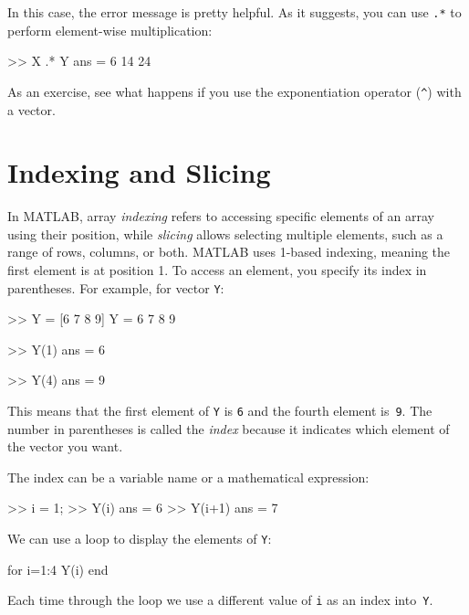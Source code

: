 In this case, the error message is pretty helpful.  As it suggests, you can use \lstinline{.*} to perform element-wise multiplication:


\begin{code}
>> X .* Y
ans = 6    14    24
\end{code}

As an exercise, see what happens if you use the exponentiation operator
(\lstinline{^}) with a vector.

\section{Indexing and Slicing}

In MATLAB, array \emph{indexing} refers to accessing specific elements of an array using their position, while \emph{slicing} allows selecting multiple elements, such as a range of rows, columns, or both.  MATLAB uses 1-based indexing, meaning the first element is at position 1. To access an element, you specify its index in parentheses. For example, for vector \lstinline{Y}:



\begin{code}
>> Y = [6 7 8 9]
Y = 6    7     8     9

>> Y(1)
ans = 6

>> Y(4)
ans = 9
\end{code}

This means that the first element of \lstinline{Y} is \lstinline{6} and the
fourth element is~\lstinline{9}.  
The number in parentheses is called the \emph{index} because it indicates which element of the vector you want.


The index can be a variable name or a mathematical expression:

\begin{code}
>> i = 1;
>> Y(i)
ans = 6
>> Y(i+1)
ans = 7
\end{code}

We can use a loop to display the elements of \lstinline{Y}:


\begin{code}
for i=1:4
     Y(i)
end
\end{code}

Each time through the loop we use a different value of \lstinline{i}
as an index into~\lstinline{Y}.

